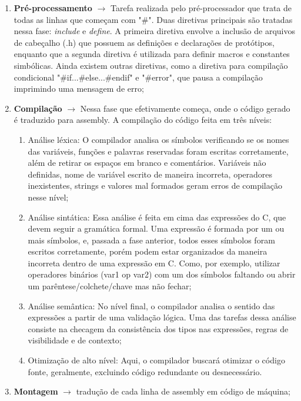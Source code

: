\begin{enumerate}
    \item \textbf{Pré-processamento} $\rightarrow$ Tarefa realizada pelo pré-processador que trata de todas as linhas que começam com "\#". Duas diretivas principais são tratadas nessa fase: \textit{include} e \textit{define}. A primeira diretiva envolve a inclusão de arquivos de cabeçalho (.h) que possuem as definições e declarações de protótipos, enquanto que a segunda diretiva é utilizada para definir macros e constantes simbólicas. Ainda existem outras diretivas, como a diretiva para compilação condicional "\#if...\#else...\#endif" e "\#error", que pausa a compilação imprimindo uma mensagem de erro;
    \item \textbf{Compilação} $\rightarrow$ Nessa fase que efetivamente começa, onde o código gerado é traduzido para assembly. A compilação do código feita em três níveis:
    \begin{enumerate}
        \item Análise léxica: O compilador analisa os símbolos verificando se os nomes das variáveis, funções e palavras reservadas foram escritas corretamente, além de retirar os espaços em branco e comentários. Variáveis não definidas, nome de variável escrito de maneira incorreta, operadores inexistentes, strings e valores mal formados geram erros de compilação nesse nível;
        \item Análise sintática: Essa análise é feita em cima das expressões do C, que devem seguir a gramática formal. Uma expressão é formada por um ou mais símbolos, e, passada a fase anterior, todos esses símbolos foram escritos corretamente, porém podem estar organizados da maneira incorreta dentro de uma expressão em C. Como, por exemplo, utilizar operadores binários (var1 op var2) com um dos símbolos faltando ou abrir um parêntese/colchete/chave mas não fechar;
        \item Análise semântica: No nível final, o compilador analisa o sentido das expressões a partir de uma validação lógica. Uma das tarefas dessa análise consiste na checagem da consistência dos tipos nas expressões, regras de visibilidade e de contexto;
        \item Otimização de alto nível: Aqui, o compilador buscará otimizar o código fonte, geralmente, excluindo código redundante ou desnecessário.
    \end{enumerate}
    \item \textbf{Montagem} $\rightarrow$ tradução de cada linha de assembly em código de máquina;

\end{enumerate}
